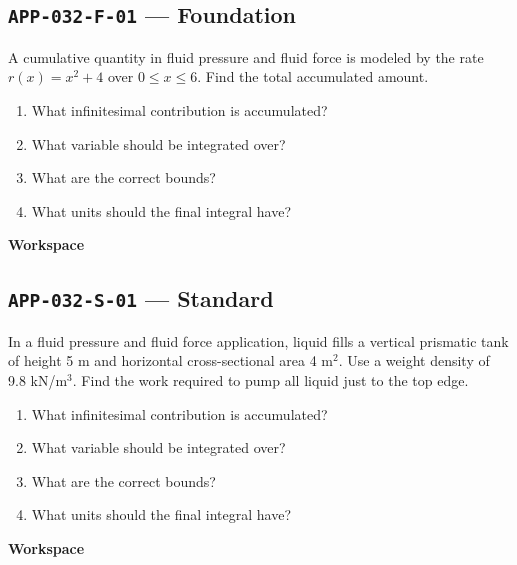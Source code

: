 \documentclass[11pt]{book}
\newcommand{\pid}[1]{\texttt{#1}}
\newcommand{\workspace}{\par\vspace{0.7in}\hrulefill\par\vspace{0.55in}\hrulefill\par}
\begin{document}
\subsection*{\pid{APP-032-F-01} — Foundation}
\begin{problembox}
A cumulative quantity in fluid pressure and fluid force is modeled by the rate $r(x)=x^2+4$ over $0\le x\le 6$. Find the total accumulated amount.
\end{problembox}
\begin{promptbox}\begin{enumerate}
\item What infinitesimal contribution is accumulated?
\item What variable should be integrated over?
\item What are the correct bounds?
\item What units should the final integral have?
\end{enumerate}\end{promptbox}
\textbf{Workspace}\workspace
{}
\subsection*{\pid{APP-032-S-01} — Standard}
\begin{problembox}
In a fluid pressure and fluid force application, liquid fills a vertical prismatic tank of height 5 m and horizontal cross-sectional area 4 m$^2$. Use a weight density of 9.8 kN/m$^3$. Find the work required to pump all liquid just to the top edge.
\end{problembox}
\begin{promptbox}\begin{enumerate}
\item What infinitesimal contribution is accumulated?
\item What variable should be integrated over?
\item What are the correct bounds?
\item What units should the final integral have?
\end{enumerate}\end{promptbox}
\textbf{Workspace}\workspace
{}
\end{document}
